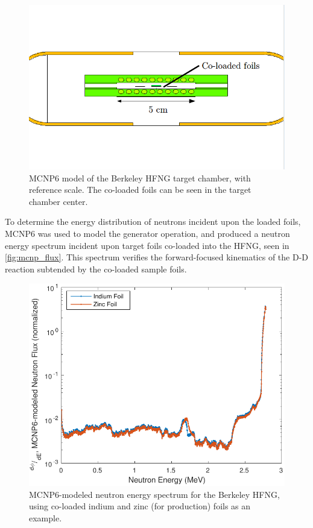 \documentclass[5p]{elsarticle}
\begin{document}
\begin{figure}
 \centering
 \includegraphics[trim = 0mm 0mm 2mm 0mm, clip,width=\columnwidth]{./figures/mcnp_vised2.png}
 \caption{MCNP6 model of the Berkeley HFNG target chamber, with reference scale. The co-loaded foils can be seen in the target chamber center.}
 \label{fig:mcnp_vised}
\end{figure}


To determine the energy distribution of neutrons incident upon the loaded foils, MCNP6 was used to model the generator operation, and produced a neutron energy spectrum incident upon target foils co-loaded into the HFNG, seen in \autoref{fig:mcnp_flux}. This spectrum verifies the forward-focused kinematics of the D-D reaction subtended by the co-loaded sample foils.

\begin{figure}
 \centering
 \includegraphics[scale=0.6]{./figures/mcnp_flux.pdf}
 \caption{MCNP6-modeled neutron energy spectrum for the Berkeley HFNG, using co-loaded indium and zinc (for  production) foils as an example.}
 \label{fig:mcnp_flux}
\end{figure}
\end{document}
